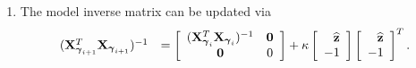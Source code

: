 {\begin{enumerate}
	\item The model inverse matrix can be updated via  
	$$
	\begin{array}{rl}
	({\bf X}_{{\boldsymbol \gamma}_{i+1}}^T{\bf X}_{{\boldsymbol \gamma}_{i+1}})^{-1}
	&\displaystyle = 
	\left[ \begin{array}{cc}
	({\bf X}_{{\boldsymbol \gamma}_{i}}^T{\bf X}_{{\boldsymbol \gamma}_{i}})^{-1}    & {\bf 0} \\
	{\bf 0}             
	& 0
	\end{array} \right] + \kappa \left[ \begin{array}{r}
	\widehat{{\bf z}} \\
	-1 \\
	\end{array} \right] \left[ \begin{array}{r}
	\widehat{{\bf z}} \\
	-1 \\
	\end{array} \right]^T.
	\end{array} 
	$$
	

\end{enumerate}}
